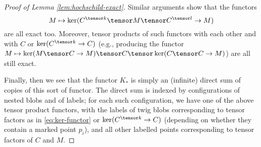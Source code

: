 \begin{proof}[Proof of Lemma \ref{lem:hochschild-exact}]
Similar arguments show that the functors
\begin{equation}
\label{eq:ker-functor}%
M \mapsto \ker(C^{\tensor k} \tensor M \tensor C^{\tensor l} \to M)
\end{equation}
are all exact too.
Moreover, tensor products of such functors with each
other and with $C$ or $\ker(C^{\tensor k} \to C)$ (e.g., producing the functor $M \mapsto \ker(M \tensor C \to M)
\tensor C \tensor \ker(C \tensor C \to M)$) are all still exact.

Finally, then we see that the functor $K_*$ is simply an (infinite)
direct sum of copies of this sort of functor.
The direct sum is indexed by
configurations of nested blobs and of labels; for each such configuration, we have one of 
the above tensor product functors,
with the labels of twig blobs corresponding to tensor factors as in \eqref{eq:ker-functor} 
or $\ker(C^{\tensor k} \to C)$ (depending on whether they contain a marked point $p_i$), and all other labelled points corresponding
to tensor factors of $C$ and $M$.
\end{proof}
